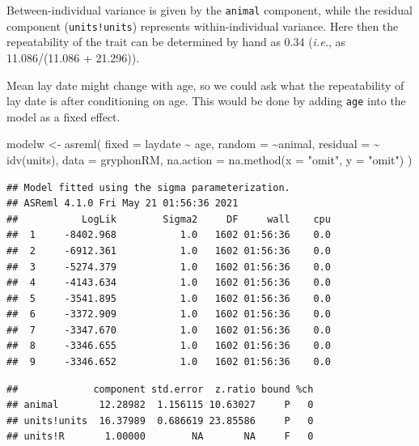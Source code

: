 \documentclass[
  12pt,
]{book}
\newenvironment{Shaded}{\begin{snugshade}}{\end{snugshade}}
\newcommand{\AttributeTok}[1]{\textcolor[rgb]{0.77,0.63,0.00}{#1}}
\newcommand{\FunctionTok}[1]{\textcolor[rgb]{0.00,0.00,0.00}{#1}}
\newcommand{\NormalTok}[1]{#1}
\newcommand{\OtherTok}[1]{\textcolor[rgb]{0.56,0.35,0.01}{#1}}
\newcommand{\SpecialCharTok}[1]{\textcolor[rgb]{0.00,0.00,0.00}{#1}}
\newcommand{\StringTok}[1]{\textcolor[rgb]{0.31,0.60,0.02}{#1}}
\begin{document}
Between-individual variance is given by the \texttt{animal} component, while the residual component (\texttt{units!units}) represents within-individual variance. Here then the repeatability of the trait can be determined by hand as 0.34 (\emph{i.e.}, as 11.086/(11.086 + 21.296)).

Mean lay date might change with age, so we could ask what the repeatability of lay date is after conditioning on age. This would be done by adding \texttt{age} into the model as a fixed effect.

\begin{Shaded}
\begin{Highlighting}[]
\NormalTok{modelw }\OtherTok{\textless{}{-}} \FunctionTok{asreml}\NormalTok{(}
  \AttributeTok{fixed =}\NormalTok{ laydate }\SpecialCharTok{\textasciitilde{}}\NormalTok{ age,}
  \AttributeTok{random =} \SpecialCharTok{\textasciitilde{}}\NormalTok{animal,}
  \AttributeTok{residual =} \SpecialCharTok{\textasciitilde{}} \FunctionTok{idv}\NormalTok{(units),}
  \AttributeTok{data =}\NormalTok{ gryphonRM,}
  \AttributeTok{na.action =} \FunctionTok{na.method}\NormalTok{(}\AttributeTok{x =} \StringTok{"omit"}\NormalTok{, }\AttributeTok{y =} \StringTok{"omit"}\NormalTok{)}
\NormalTok{)}
\end{Highlighting}
\end{Shaded}

\begin{verbatim}
## Model fitted using the sigma parameterization.
## ASReml 4.1.0 Fri May 21 01:56:36 2021
##           LogLik        Sigma2     DF     wall    cpu
##  1     -8402.968           1.0   1602 01:56:36    0.0
##  2     -6912.361           1.0   1602 01:56:36    0.0
##  3     -5274.379           1.0   1602 01:56:36    0.0
##  4     -4143.634           1.0   1602 01:56:36    0.0
##  5     -3541.895           1.0   1602 01:56:36    0.0
##  6     -3372.909           1.0   1602 01:56:36    0.0
##  7     -3347.670           1.0   1602 01:56:36    0.0
##  8     -3346.655           1.0   1602 01:56:36    0.0
##  9     -3346.652           1.0   1602 01:56:36    0.0
\end{verbatim}

\begin{Shaded}
\end{Shaded}

\begin{verbatim}
##             component std.error  z.ratio bound %ch
## animal       12.28982  1.156115 10.63027     P   0
## units!units  16.37989  0.686619 23.85586     P   0
## units!R       1.00000        NA       NA     F   0
\end{verbatim}
\end{document}
